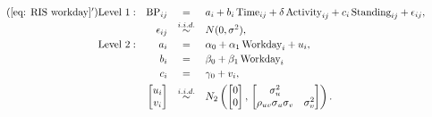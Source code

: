 \documentclass[12pt,twoside,letterpaper]{article}
\theoremstyle{definition}
\theoremstyle{definition}
\begin{document}
\begin{equation}\label{eq: RIS workday no stand}
    \begin{array}{rrcll}\tag{\ref{eq: RIS workday}$'$}
        \text{Level 1}: & \text{BP}_{ij} &=& a_i + b_i\, \text{Time}_{ij} + \delta \, \text{Activity}_{ij} + c_i\, \text{Standing}_{ij} + \epsilon_{ij}, \\[0.5ex]
         & \epsilon_{ij} &\overset{i.i.d.}{\sim}& N(0, \sigma^2), \\[0.5ex]
        \text{Level 2}: & a_i &=& \alpha_0 + \alpha_1\, \text{Workday}_i + u_i, \\[0.5ex]
        & b_i &=& \beta_0 + \beta_1\, \text{Workday}_i \\[0.5ex]
        & c_i &=& \gamma_0 + v_i, \\[1ex]
         & \begin{bmatrix} u_i \\ v_i 
         \end{bmatrix} &\overset{i.i.d.}{\sim}& N_2\left(\begin{bmatrix} 0 \\ 0 \end{bmatrix},\, \begin{bmatrix} \sigma_u^2 &\\ 
         \rho_{uv}\sigma_u\sigma_v & \sigma_v^2\\
         \end{bmatrix} \right).
    \end{array}
\end{equation}
\end{document}
